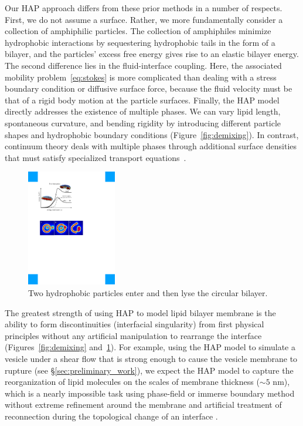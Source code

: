 Our HAP approach differs from these prior methods in a number of respects.
First, we do not assume a surface. Rather, we more fundamentally
consider a collection of amphiphilic particles.  The collection of
amphiphiles minimize hydrophobic interactions by sequestering
hydrophobic tails in the form of a bilayer, and the particles' excess
free energy gives rise to an elastic bilayer energy. The second
difference lies in the fluid-interface coupling. Here, the associated
mobility problem~\eqref{eq:stokes} is more complicated than dealing with
a stress boundary condition or diffusive surface force, because the
fluid velocity must be that of a rigid body motion at the particle
surfaces. Finally, the HAP model directly addresses the existence of multiple phases.
We can vary lipid length, spontaneous curvature, and bending rigidity by
introducing different particle shapes and hydrophobic boundary
conditions (Figure~\ref{fig:demixing}). In contrast, continuum theory
deals with multiple phases through additional surface densities that
must satisfy specialized transport equations~\cite{Lowengrub07,
MikuckiZhou17}. 


\begin{figure}
\centerline{\includegraphics[width=0.35\textwidth]{figures/Lysis.pdf}}
  \vspace{-8pt}
  \caption{\label{fig:lysis} \footnotesize Two hydrophobic particles
  enter and then lyse the circular bilayer.}
\end{figure}
The greatest strength of using HAP to model lipid bilayer membrane is
the ability to form discontinuities (interfacial singularity) from first
physical principles without any artificial manipulation to rearrange the
interface (Figures~\ref{fig:demixing} and~\ref{fig:lysis}).  For
example, using the HAP model to simulate a vesicle under a shear flow
that is strong enough to cause the vesicle membrane to rupture (see
\S\ref{sec:preliminary_work}), we expect the HAP model to capture the
reorganization of lipid molecules on the scales of membrane thickness
($\sim 5$ nm), which is a nearly impossible task using phase-field or
immerse boundary method without extreme refinement around the membrane
and artificial treatment of reconnection during the topological change
of an interface \cite{doi:10.1063/5.0009734, LiAn-Chang16,
doi:10.1098/rspa.2012.0505, doi:10.1137/130941432, Feetzl18,
doi:10.1137/16M1108406}.

